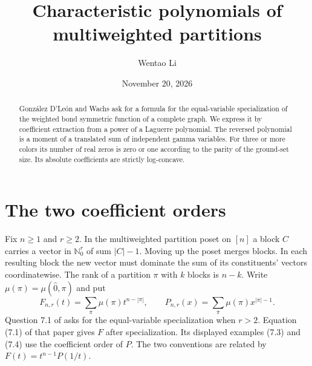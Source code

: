 \documentclass[11pt]{article}
\title{Characteristic polynomials of multiweighted partitions}
\author{Wentao Li}
\date{November 20, 2026}
\begin{document}
\maketitle
\begin{abstract}
Gonz\'alez D'Le\'on and Wachs ask for a formula for the equal-variable specialization
of the weighted bond symmetric function of a complete graph. We express it by coefficient
extraction from a power of a Laguerre polynomial. The reversed polynomial is a moment
of a translated sum of independent gamma variables. For three or more colors its number
of real zeros is zero or one according to the parity of the ground-set size. Its absolute
coefficients are strictly log-concave.
\end{abstract}

\section{The two coefficient orders}
Fix $n\ge1$ and $r\ge2$. In the multiweighted partition poset on $[n]$ a block $C$
carries a vector in $\mathbb N_0^r$ of sum $|C|-1$. Moving up the poset merges
blocks. In each resulting block the new vector must dominate the sum of its
constituents' vectors coordinatewise. The rank of a partition $\pi$ with $k$ blocks
is $n-k$. Write $\mu(\pi)=\mu(\hat 0,\pi)$ and put
\[
 F_{n,r}(t)=\sum_\pi\mu(\pi)t^{n-|\pi|},\qquad
 P_{n,r}(x)=\sum_\pi\mu(\pi)x^{|\pi|-1}.
\]
Question 7.1 of \cite{bond} asks for the equal-variable specialization when $r>2$.
Equation (7.1) of that paper gives $F$ after specialization.
Its displayed examples (7.3) and (7.4) use the coefficient order of $P$.
The two conventions are related by $F(t)=t^{n-1}P(1/t)$.
\end{document}
